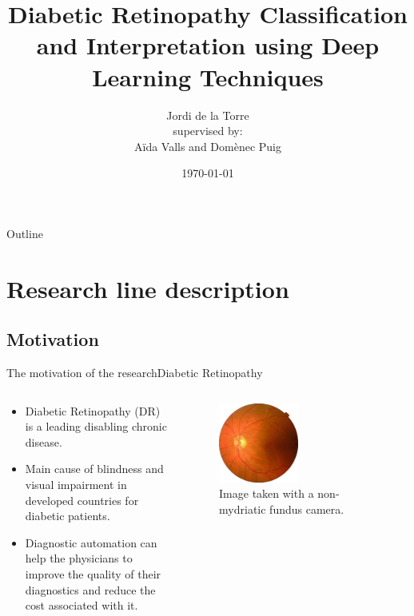\documentclass{beamer}
\title{Diabetic Retinopathy Classification and Interpretation using Deep Learning Techniques}
\author{Jordi de la Torre\inst{1} \\supervised by:\\ A\"ida Valls\inst{1} and Dom\`enec Puig\inst{1}} %
\institute[Universitat Rovira i Virgili] %
{
  \inst{1}%
  Department d'Enginyeria Inform\`atica i Matem\`atiques\\
  Escola T\`ecnica Superior d'Enginyeria\\
  Universitat Rovira i Virgili}
\date{\today}
\begin{document}
\begin{frame}
  \titlepage
\end{frame}

\begin{frame}{Outline}
  \tableofcontents
\end{frame}

\section{Research line description}

\subsection{Motivation}

\begin{frame}{The motivation of the research}{Diabetic Retinopathy}
\begin{columns}
	\begin{column}{0.5\textwidth}
		\begin{itemize}
	  	 	\item {Diabetic Retinopathy (DR) is a leading disabling chronic disease.}
	  	 	\item {Main cause of blindness and visual impairment in developed countries for diabetic patients.}
	  	 	\item{Diagnostic automation can help the physicians to improve the quality of their diagnostics and reduce the cost associated with it.}
	  	\end{itemize}	
	\end{column}
	\begin{column}{0.5\textwidth}  %
		\begin{figure}[p]
			\centering
			\includegraphics[width=0.5\textwidth]{retine.eps}
			\caption{Image taken with a non-mydriatic fundus camera.}
		\end{figure}
	\end{column}
\end{columns}

\end{frame}
\end{document}
